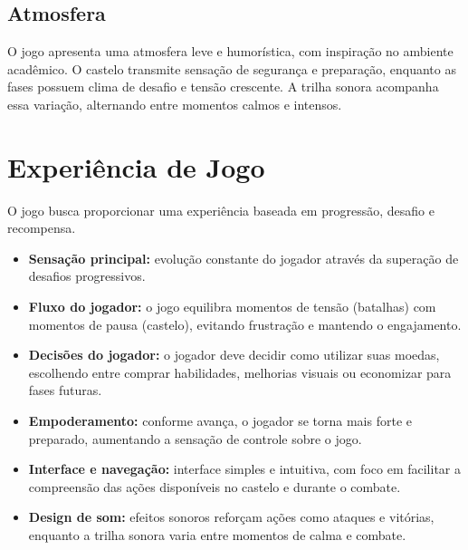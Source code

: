 \documentclass[12pt,a4paper]{article}
\begin{document}
\subsection*{Atmosfera}

O jogo apresenta uma atmosfera leve e humorística, com inspiração no ambiente acadêmico.
O castelo transmite sensação de segurança e preparação, enquanto as fases possuem clima
de desafio e tensão crescente. A trilha sonora acompanha essa variação, alternando entre
momentos calmos e intensos.

\newpage


\section*{Experiência de Jogo}

O jogo busca proporcionar uma experiência baseada em progressão, desafio e recompensa.

\begin{itemize}
    \item \textbf{Sensação principal:} evolução constante do jogador através da superação
    de desafios progressivos.
    
    \item \textbf{Fluxo do jogador:} o jogo equilibra momentos de tensão (batalhas) com
    momentos de pausa (castelo), evitando frustração e mantendo o engajamento.
    
    \item \textbf{Decisões do jogador:} o jogador deve decidir como utilizar suas moedas,
    escolhendo entre comprar habilidades, melhorias visuais ou economizar para fases futuras.
    
    \item \textbf{Empoderamento:} conforme avança, o jogador se torna mais forte e preparado,
    aumentando a sensação de controle sobre o jogo.
    
    \item \textbf{Interface e navegação:} interface simples e intuitiva, com foco em facilitar
    a compreensão das ações disponíveis no castelo e durante o combate.
    
    \item \textbf{Design de som:} efeitos sonoros reforçam ações como ataques e vitórias,
    enquanto a trilha sonora varia entre momentos de calma e combate.
\end{itemize}
\end{document}
